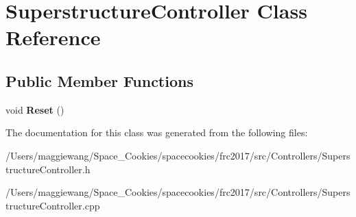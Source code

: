 \hypertarget{class_superstructure_controller}{}\section{Superstructure\+Controller Class Reference}
\label{class_superstructure_controller}
\subsection*{Public Member Functions}
\begin{DoxyCompactItemize}
\item 
\mbox{\label{class_superstructure_controller_a1dab262418ba343c7bd9b2b86a0172a0}} 
void {\bfseries Reset} ()
\end{DoxyCompactItemize}


The documentation for this class was generated from the following files\+:\begin{DoxyCompactItemize}
\item 
/\+Users/maggiewang/\+Space\+\_\+\+Cookies/spacecookies/frc2017/src/\+Controllers/Superstructure\+Controller.\+h\item 
/\+Users/maggiewang/\+Space\+\_\+\+Cookies/spacecookies/frc2017/src/\+Controllers/Superstructure\+Controller.\+cpp\end{DoxyCompactItemize}

